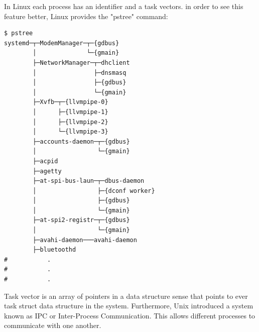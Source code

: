 \documentclass[journal,10pt,onecolumn,compsoc,letterpaper,draftclsnofoot,table,xcdraw]{IEEEtran} \usepackage[margin=0.75in]{geometry}
\begin{document}
\noindent In Linux each process has an identifier and a task vectors. in order to see this feature better, Linux provides the "pstree" command:
\begin{verbatim}
$ pstree
systemd─┬─ModemManager─┬─{gdbus}
        │              └─{gmain}
        ├─NetworkManager─┬─dhclient
        │                ├─dnsmasq
        │                ├─{gdbus}
        │                └─{gmain}
        ├─Xvfb─┬─{llvmpipe-0}
        │      ├─{llvmpipe-1}
        │      ├─{llvmpipe-2}
        │      └─{llvmpipe-3}
        ├─accounts-daemon─┬─{gdbus}
        │                 └─{gmain}
        ├─acpid
        ├─agetty
        ├─at-spi-bus-laun─┬─dbus-daemon
        │                 ├─{dconf worker}
        │                 ├─{gdbus}
        │                 └─{gmain}
        ├─at-spi2-registr─┬─{gdbus}
        │                 └─{gmain}
        ├─avahi-daemon───avahi-daemon
        ├─bluetoothd
#			.
#			.
#			.
\end{verbatim}
\noindent Task vector is an array of pointers in a data structure sense that points to ever task struct data structure in the system. Furthermore, Unix introduced a system known as IPC or Inter-Process Communication. This allows different processes to communicate with one another.
\end{document}
